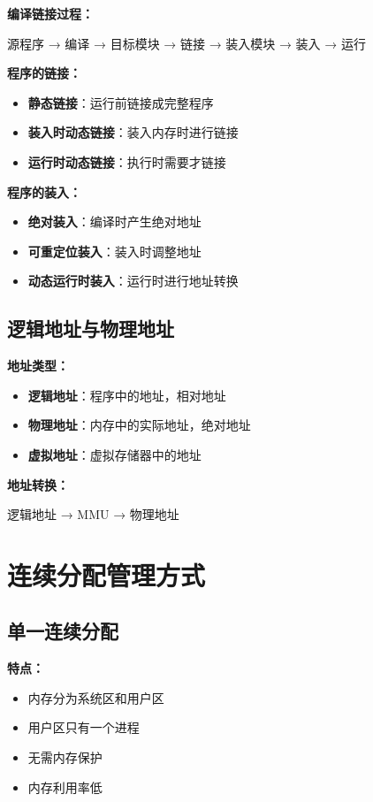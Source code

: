 \documentclass[lang=cn,newtx,10pt,scheme=chinese]{../../elegantbook}
\begin{document}
\textbf{编译链接过程：}
\begin{center}
源程序 → 编译 → 目标模块 → 链接 → 装入模块 → 装入 → 运行
\end{center}

\textbf{程序的链接：}
\begin{itemize}
  \item \textbf{静态链接}：运行前链接成完整程序
  \item \textbf{装入时动态链接}：装入内存时进行链接
  \item \textbf{运行时动态链接}：执行时需要才链接
\end{itemize}

\textbf{程序的装入：}
\begin{itemize}
  \item \textbf{绝对装入}：编译时产生绝对地址
  \item \textbf{可重定位装入}：装入时调整地址
  \item \textbf{动态运行时装入}：运行时进行地址转换
\end{itemize}

\subsection{逻辑地址与物理地址}

\textbf{地址类型：}
\begin{itemize}
  \item \textbf{逻辑地址}：程序中的地址，相对地址
  \item \textbf{物理地址}：内存中的实际地址，绝对地址
  \item \textbf{虚拟地址}：虚拟存储器中的地址
\end{itemize}

\textbf{地址转换：}
\begin{center}
逻辑地址 → MMU → 物理地址
\end{center}

\section{连续分配管理方式}

\subsection{单一连续分配}

\textbf{特点：}
\begin{itemize}
  \item 内存分为系统区和用户区
  \item 用户区只有一个进程
  \item 无需内存保护
  \item 内存利用率低
\end{itemize}
\end{document}
